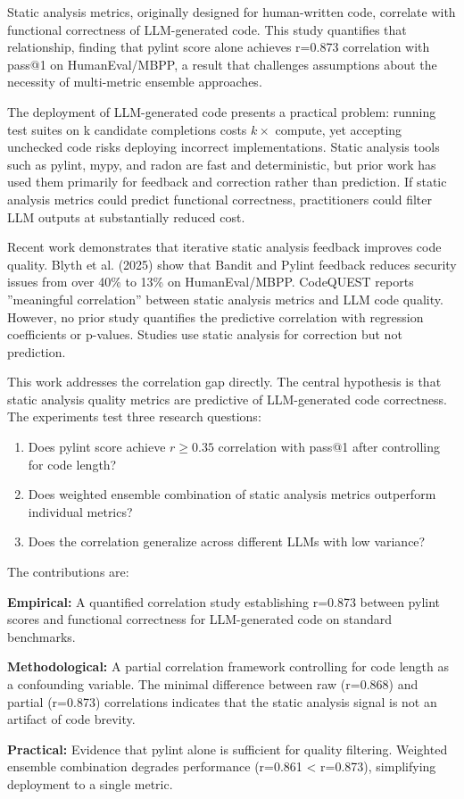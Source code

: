 
Static analysis metrics, originally designed for human-written code, correlate with functional correctness of LLM-generated code. This study quantifies that relationship, finding that pylint score alone achieves r=0.873 correlation with pass@1 on HumanEval/MBPP, a result that challenges assumptions about the necessity of multi-metric ensemble approaches.

The deployment of LLM-generated code presents a practical problem: running test suites on k candidate completions costs $k\times$ compute, yet accepting unchecked code risks deploying incorrect implementations. Static analysis tools such as pylint, mypy, and radon are fast and deterministic, but prior work has used them primarily for feedback and correction rather than prediction. If static analysis metrics could predict functional correctness, practitioners could filter LLM outputs at substantially reduced cost.

Recent work demonstrates that iterative static analysis feedback improves code quality. Blyth et al. (2025) show that Bandit and Pylint feedback reduces security issues from over 40\% to 13\% on HumanEval/MBPP. CodeQUEST \citep{Liu2025CodeQUEST} reports ''meaningful correlation'' between static analysis metrics and LLM code quality. However, no prior study quantifies the predictive correlation with regression coefficients or p-values. Studies use static analysis for correction but not prediction.

This work addresses the correlation gap directly. The central hypothesis is that static analysis quality metrics are predictive of LLM-generated code correctness. The experiments test three research questions:

\begin{enumerate}
\item Does pylint score achieve $r\geq 0.35$ correlation with pass@1 after controlling for code length?
\item Does weighted ensemble combination of static analysis metrics outperform individual metrics?
\item Does the correlation generalize across different LLMs with low variance?
\end{enumerate}

The contributions are:

\textbf{Empirical:} A quantified correlation study establishing r=0.873 between pylint scores and functional correctness for LLM-generated code on standard benchmarks.

\textbf{Methodological:} A partial correlation framework controlling for code length as a confounding variable. The minimal difference between raw (r=0.868) and partial (r=0.873) correlations indicates that the static analysis signal is not an artifact of code brevity.

\textbf{Practical:} Evidence that pylint alone is sufficient for quality filtering. Weighted ensemble combination degrades performance (r=0.861 < r=0.873), simplifying deployment to a single metric.
